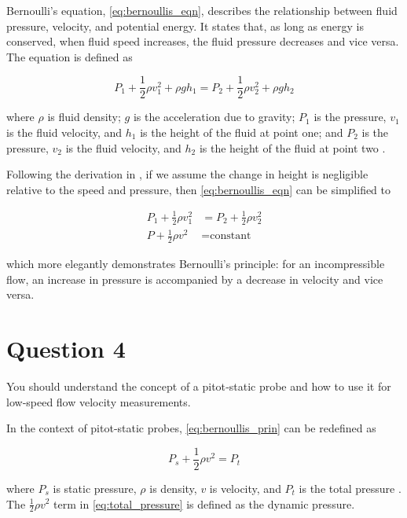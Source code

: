 Bernoulli’s equation, \autoref{eq:bernoullis_eqn}, describes the relationship between fluid pressure, velocity, and potential energy. It states that, as long as energy is conserved, when fluid speed increases, the fluid pressure decreases and vice versa. The equation is defined as

\begin{equation} \label{eq:bernoullis_eqn}
    P_1 + \frac{1}{2} \rho{} v_1^2 + \rho{} g h_1 = P_2 + \frac{1}{2} \rho{} v_2^2 + \rho{} g h_2
\end{equation}

\noindent where $\rho$ is fluid density; $g$ is the acceleration due to gravity; $P_1$ is the pressure, $v_1$ is the fluid velocity, and $h_1$ is the height of the fluid at point one; and $P_2$ is the pressure, $v_2$ is the fluid velocity, and $h_2$ is the height of the fluid at point two \citep{Khan_Academy}.

Following the derivation in \citet{Khan_Academy}, if we assume the change in height is negligible relative to the speed and pressure, then \autoref{eq:bernoullis_eqn} can be simplified to

\begin{align}
    P_1 + \frac{1}{2} \rho{} v_1^2 &= P_2 + \frac{1}{2} \rho{} v_2^2 \nonumber \\
    P + \frac{1}{2} \rho{} v^2 &= \text{constant} \label{eq:bernoullis_prin}
\end{align}

\noindent which more elegantly demonstrates Bernoulli's principle: for an incompressible flow, an increase in pressure is accompanied by a decrease in velocity and vice versa.

\section{Question 4}
\begin{importantbox}
    You should understand the concept of a pitot‐static probe and how to use it for low‐speed flow velocity measurements.
\end{importantbox}

In the context of pitot-static probes, \autoref{eq:bernoullis_prin} can be redefined as

\begin{equation} \label{eq:total_pressure}
    P_s + \frac{1}{2} \rho v^2 = P_t
\end{equation}

\noindent where $P_s$ is static pressure, $\rho$ is density, $v$ is velocity, and $P_t$ is the total pressure \citep{Hall_2023}. The $\frac{1}{2} \rho v^2$ term in \autoref{eq:total_pressure} is defined as the dynamic pressure.

